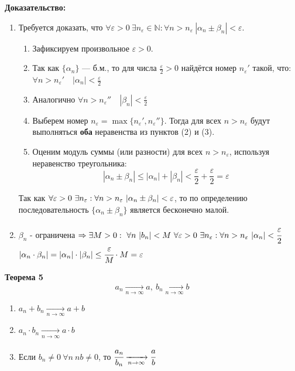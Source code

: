 \begin{tcolorbox}[title=Доказательство Т4: Предел суммы/разности б.м. последовательностей, breakable]
\small

\textbf{Доказательство:}
\begin{enumerate}

\item[I] Требуется доказать, что \( \forall \varepsilon > 0\ \exists n_\varepsilon \in \mathbb{N} : \forall n > n_\varepsilon\ |\alpha_n \pm \beta_n| < \varepsilon \).

\begin{enumerate}
    \item[1.] Зафиксируем произвольное \( \varepsilon > 0 \).
    \item[2.] Так как \( \{\alpha_n\} \) — б.м., то для числа \( \frac{\varepsilon}{2} > 0 \) найдётся номер \( n_{\varepsilon}' \) такой, что: $\forall n > n_{\varepsilon}'\quad |\alpha_n| < \frac{\varepsilon}{2}$
    
    \item[3.] Аналогично $\forall n > n_{\varepsilon}''\quad |\beta_n| < \frac{\varepsilon}{2}$
    
    \item[4.] Выберем номер \( n_\varepsilon = \max\{n_{\varepsilon}', n_{\varepsilon}''\} \). Тогда для всех \( n > n_\varepsilon \) будут выполняться \textbf{оба} неравенства из пунктов (2) и (3).
    \item[5.] Оценим модуль суммы (или разности) для всех \( n > n_\varepsilon \), используя неравенство треугольника:
    \[
    |\alpha_n \pm \beta_n| \leq |\alpha_n| + |\beta_n| < \frac{\varepsilon}{2} + \frac{\varepsilon}{2} = \varepsilon
    \]
\end{enumerate}

Так как \( \forall \varepsilon > 0\ \exists n_\varepsilon: \forall n > n_\eps\ |\alpha_n \pm \beta_n| < \varepsilon \), то по определению последовательность \( \{\alpha_n \pm \beta_n\} \) является бесконечно малой.

\item[II] {$\beta_n$} - ограничена $\Rightarrow \exists M > 0:\ \forall n \ |b_n| < M \ \forall\eps > 0\ \exists n_\eps : \forall n > n_\eps\ |\alpha_n| < \cfrac{\eps}{2}$\\
$|\alpha_n \cdot \beta_n|= |\alpha_n| \cdot |\beta_n| \leq \cfrac{\varepsilon}{M} \cdot M = \varepsilon$
\end{enumerate}
\end{tcolorbox}

\begin{tcolorbox}
\textbf{Теорема 5}
\[ a_n \xrightarrow[n\rightarrow \infty]{}a,\ b_n \xrightarrow[n\rightarrow \infty]{}b\]
\begin{enumerate}
    \item $a_n + b_n \xrightarrow[n\rightarrow \infty]{} a + b$
    \item $a_n \cdot b_n \xrightarrow[n\rightarrow \infty]{} a \cdot b$
    \item Если $b_n \ne 0\ \forall n \ nb \ne 0$, то $\cfrac{a_n}{b_n} \xrightarrow[n\rightarrow \infty]{} \cfrac{a}{b}$
\end{enumerate}
\end{tcolorbox}

